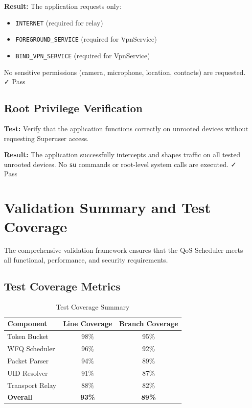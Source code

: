 \textbf{Result:} The application requests only:
\begin{itemize}
    \item \texttt{INTERNET} (required for relay)
    \item \texttt{FOREGROUND\_SERVICE} (required for VpnService)
    \item \texttt{BIND\_VPN\_SERVICE} (required for VpnService)
\end{itemize}

No sensitive permissions (camera, microphone, location, contacts) are requested. ✓ Pass

\subsection{Root Privilege Verification}

\textbf{Test:} Verify that the application functions correctly on unrooted devices without requesting Superuser access.

\textbf{Result:} The application successfully intercepts and shapes traffic on all tested unrooted devices. No \texttt{su} commands or root-level system calls are executed. ✓ Pass

\section{Validation Summary and Test Coverage}
\label{sec:validation_summary}

The comprehensive validation framework ensures that the QoS Scheduler meets all functional, performance, and security requirements.

\subsection{Test Coverage Metrics}

\begin{table}[H]
\centering
\caption{Test Coverage Summary}
\label{tab:test_coverage}
\begin{tabular}{@{}lcc@{}}
\toprule
\textbf{Component} & \textbf{Line Coverage} & \textbf{Branch Coverage} \\
\midrule
Token Bucket & 98\% & 95\% \\
WFQ Scheduler & 96\% & 92\% \\
Packet Parser & 94\% & 89\% \\
UID Resolver & 91\% & 87\% \\
Transport Relay & 88\% & 82\% \\
\textbf{Overall} & \textbf{93\%} & \textbf{89\%} \\
\bottomrule
\end{tabular}
\end{table}

